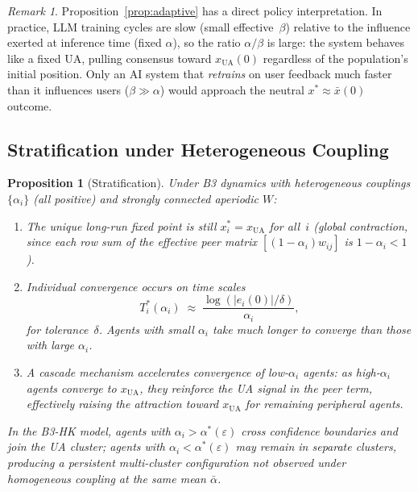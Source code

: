 \documentclass{article}
\theoremstyle{plain}
\newtheorem{proposition}[theorem]{Proposition}
\theoremstyle{definition}
\theoremstyle{remark}
\newtheorem{remark}[theorem]{Remark}
\newcommand{\xUA}{x_{\mathrm{UA}}}
\newcommand{\xbar}{\bar{x}}
\begin{document}
\begin{remark}
Proposition~\ref{prop:adaptive} has a direct policy interpretation.
In practice, LLM training cycles are slow (small effective~$\beta$)
relative to the influence exerted at inference time (fixed $\alpha$),
so the ratio $\alpha/\beta$ is large: the system behaves like a fixed UA,
pulling consensus toward $\xUA(0)$ regardless of the population's initial
position.  Only an AI system that \emph{retrains} on user feedback much
faster than it influences users ($\beta\gg\alpha$) would approach the
neutral $x^*\approx\xbar(0)$ outcome.
\end{remark}

\subsection{Stratification under Heterogeneous Coupling}

\begin{proposition}[Stratification]
\label{prop:stratification}
Under B3 dynamics with heterogeneous couplings $\{\alpha_i\}$ (all positive)
and strongly connected aperiodic $W$:
\begin{enumerate}
    \item The unique long-run fixed point is still $x_i^*=\xUA$ for all~$i$
    (global contraction, since each row sum of the effective peer matrix
    $[(1-\alpha_i)w_{ij}]$ is $1-\alpha_i<1$).
    \item Individual convergence occurs on time scales
    \begin{equation}
        T_i^*(\alpha_i)\;\approx\;\frac{\log(|e_i(0)|/\delta)}{\alpha_i},
        \label{eq:Ti}
    \end{equation}
    for tolerance~$\delta$.  Agents with small $\alpha_i$ take much longer
    to converge than those with large $\alpha_i$.
    \item A cascade mechanism accelerates convergence of low-$\alpha_i$
    agents: as high-$\alpha_i$ agents converge to $\xUA$, they reinforce
    the UA signal in the peer term, effectively raising the attraction
    toward $\xUA$ for remaining peripheral agents.
\end{enumerate}
In the B3-HK model, agents with $\alpha_i>\alpha^*(\varepsilon)$ cross
confidence boundaries and join the UA cluster; agents with
$\alpha_i<\alpha^*(\varepsilon)$ may remain in separate clusters, producing
a persistent multi-cluster configuration not observed under homogeneous
coupling at the same mean $\bar\alpha$.
\end{proposition}
\end{document}

